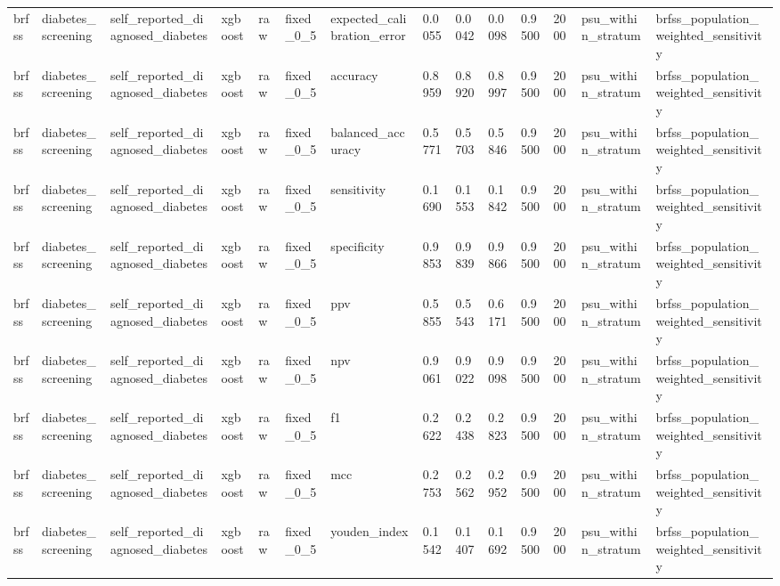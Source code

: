 \begin{tabular}{llllllllllllll}
brfss & diabetes\_screening & self\_reported\_diagnosed\_diabetes & xgboost & raw & fixed\_0\_5 & expected\_calibration\_error & 0.0055 & 0.0042 & 0.0098 & 0.9500 & 2000 & psu\_within\_stratum & brfss\_population\_weighted\_sensitivity \\
brfss & diabetes\_screening & self\_reported\_diagnosed\_diabetes & xgboost & raw & fixed\_0\_5 & accuracy & 0.8959 & 0.8920 & 0.8997 & 0.9500 & 2000 & psu\_within\_stratum & brfss\_population\_weighted\_sensitivity \\
brfss & diabetes\_screening & self\_reported\_diagnosed\_diabetes & xgboost & raw & fixed\_0\_5 & balanced\_accuracy & 0.5771 & 0.5703 & 0.5846 & 0.9500 & 2000 & psu\_within\_stratum & brfss\_population\_weighted\_sensitivity \\
brfss & diabetes\_screening & self\_reported\_diagnosed\_diabetes & xgboost & raw & fixed\_0\_5 & sensitivity & 0.1690 & 0.1553 & 0.1842 & 0.9500 & 2000 & psu\_within\_stratum & brfss\_population\_weighted\_sensitivity \\
brfss & diabetes\_screening & self\_reported\_diagnosed\_diabetes & xgboost & raw & fixed\_0\_5 & specificity & 0.9853 & 0.9839 & 0.9866 & 0.9500 & 2000 & psu\_within\_stratum & brfss\_population\_weighted\_sensitivity \\
brfss & diabetes\_screening & self\_reported\_diagnosed\_diabetes & xgboost & raw & fixed\_0\_5 & ppv & 0.5855 & 0.5543 & 0.6171 & 0.9500 & 2000 & psu\_within\_stratum & brfss\_population\_weighted\_sensitivity \\
brfss & diabetes\_screening & self\_reported\_diagnosed\_diabetes & xgboost & raw & fixed\_0\_5 & npv & 0.9061 & 0.9022 & 0.9098 & 0.9500 & 2000 & psu\_within\_stratum & brfss\_population\_weighted\_sensitivity \\
brfss & diabetes\_screening & self\_reported\_diagnosed\_diabetes & xgboost & raw & fixed\_0\_5 & f1 & 0.2622 & 0.2438 & 0.2823 & 0.9500 & 2000 & psu\_within\_stratum & brfss\_population\_weighted\_sensitivity \\
brfss & diabetes\_screening & self\_reported\_diagnosed\_diabetes & xgboost & raw & fixed\_0\_5 & mcc & 0.2753 & 0.2562 & 0.2952 & 0.9500 & 2000 & psu\_within\_stratum & brfss\_population\_weighted\_sensitivity \\
brfss & diabetes\_screening & self\_reported\_diagnosed\_diabetes & xgboost & raw & fixed\_0\_5 & youden\_index & 0.1542 & 0.1407 & 0.1692 & 0.9500 & 2000 & psu\_within\_stratum & brfss\_population\_weighted\_sensitivity \\

\end{tabular}
